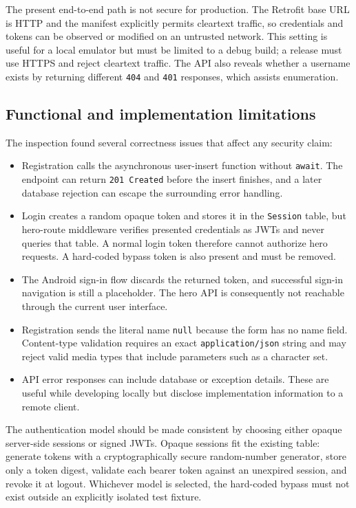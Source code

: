 The present end-to-end path is not secure for production. The Retrofit base URL is HTTP and the manifest explicitly permits cleartext traffic, so credentials and tokens can be observed or modified on an untrusted network. This setting is useful for a local emulator but must be limited to a debug build; a release must use HTTPS and reject cleartext traffic. The API also reveals whether a username exists by returning different \verb|404| and \verb|401| responses, which assists enumeration.

\subsection{Functional and implementation limitations}

The inspection found several correctness issues that affect any security claim:

\begin{itemize}
	\item Registration calls the asynchronous user-insert function without \verb|await|. The endpoint can return \verb|201 Created| before the insert finishes, and a later database rejection can escape the surrounding error handling.
	\item Login creates a random opaque token and stores it in the \verb|Session| table, but hero-route middleware verifies presented credentials as JWTs and never queries that table. A normal login token therefore cannot authorize hero requests. A hard-coded bypass token is also present and must be removed.
	\item The Android sign-in flow discards the returned token, and successful sign-in navigation is still a placeholder. The hero API is consequently not reachable through the current user interface.
	\item Registration sends the literal name \verb|null| because the form has no name field. Content-type validation requires an exact \verb|application/json| string and may reject valid media types that include parameters such as a character set.
	\item API error responses can include database or exception details. These are useful while developing locally but disclose implementation information to a remote client.
\end{itemize}

The authentication model should be made consistent by choosing either opaque server-side sessions or signed JWTs. Opaque sessions fit the existing table: generate tokens with a cryptographically secure random-number generator, store only a token digest, validate each bearer token against an unexpired session, and revoke it at logout. Whichever model is selected, the hard-coded bypass must not exist outside an explicitly isolated test fixture.

